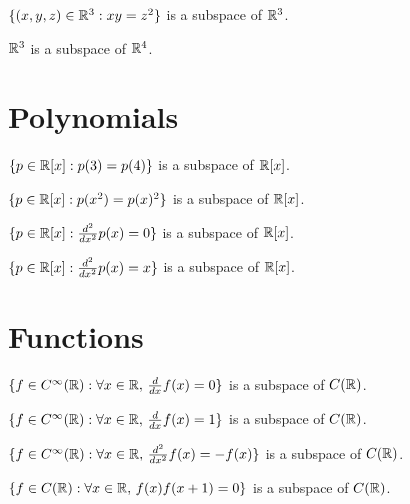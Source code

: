 \documentclass{homework}
\begin{document}
\begin{truefalse}
  $\{ (x,y,z) \in \mathbb{R}^3 : xy = z^2 \}$ is a subspace of $\mathbb{R}^3$.
\end{truefalse}

\begin{truefalse}
  $\mathbb{R}^3$ is a subspace of $\mathbb{R}^4$.
\end{truefalse}

\section{Polynomials}

\begin{truefalse}
  $\{ p \in \mathbb{R}[x] : p(3) = p(4) \}$ is a subspace of $\mathbb{R}[x]$.
\end{truefalse}

\begin{truefalse}
  $\{ p \in \mathbb{R}[x] :  p(x^2) = p(x)^2 \}$ is a subspace of $\mathbb{R}[x]$.
\end{truefalse}

\begin{truefalse}
  $\{ p \in \mathbb{R}[x] : \frac{d^2}{dx^2} p(x) = 0 \}$ is a subspace of $\mathbb{R}[x]$.
\end{truefalse}

\begin{truefalse}
  $\{ p \in \mathbb{R}[x] : \frac{d^2}{dx^2} p(x) = x \}$ is a subspace of $\mathbb{R}[x]$.
\end{truefalse}

\section{Functions}

\begin{truefalse}
  $\{ f \in C^\infty(\mathbb{R}) : \forall x \in \mathbb{R},\, \frac{d}{dx} f(x) = 0 \}$ is a subspace of $C(\mathbb{R})$.
\end{truefalse}

\begin{truefalse}
  $\{ f \in C^\infty(\mathbb{R}) : \forall x \in \mathbb{R},\, \frac{d}{dx} f(x) = 1 \}$ is a subspace of $C(\mathbb{R})$.
\end{truefalse}

\begin{truefalse}
  $\{ f \in C^\infty(\mathbb{R}) : \forall x \in \mathbb{R},\, \frac{d^2}{dx^2} f(x) = -f(x) \}$ is a subspace of $C(\mathbb{R})$.
\end{truefalse}

\begin{truefalse}
  $\{ f \in C(\mathbb{R}) : \forall x \in \mathbb{R},\, f(x) f(x+1) = 0 \}$ is a subspace of $C(\mathbb{R})$.
\end{truefalse}
\end{document}
